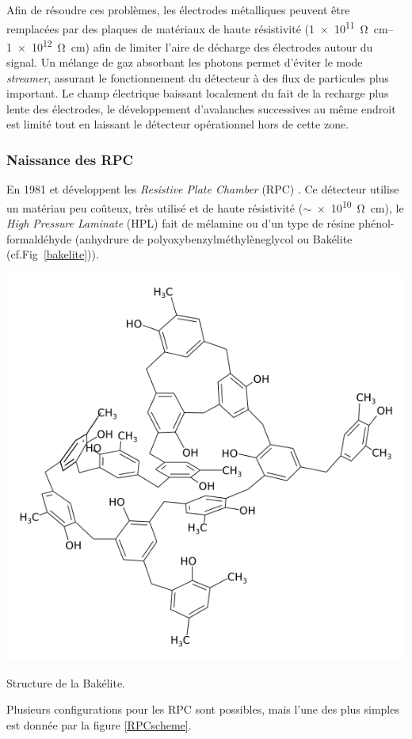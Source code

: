 Afin de résoudre ces problèmes, les électrodes métalliques peuvent être remplacées par des plaques de matériaux de haute résistivité (\SIrange{1e11}{1e12}{\ohm\centi\meter}) afin de limiter l'aire de décharge des électrodes autour du signal. Un mélange de gaz absorbant les photons permet d'éviter le mode \textit{streamer}, assurant le fonctionnement du détecteur à des flux de particules plus important. Le champ électrique baissant localement du fait de la recharge plus lente des électrodes, le développement d'avalanches successives au même endroit est limité tout en laissant le détecteur opérationnel hors de cette zone.
\vspace{-0.4cm}
\subsubsection{Naissance des RPC}
\vspace{-0.4cm}
En \num{1981}  et  développent les \textit{Resistive Plate Chamber} (RPC) \cite{Santonico:1981sc} \cite{CARDARELLI198820}. Ce détecteur utilise un matériau peu coûteux, très utilisé et de haute résistivité ($\sim$\SI{e10}{\ohm\centi\meter}), le \textit{High Pressure Laminate} (HPL) fait de mélamine ou d'un type de résine phénol-formaldéhyde (anhydrure de polyoxybenzylméthylèneglycol ou Bakélite (cf.Fig~\ref{bakelite})). 
\marginpar
{
	\centering
	\includegraphics[width=\marginparwidth]{RPC/bakelite.png}
	\captionsetup{type=figure}\caption{Structure de la Bakélite.}
	\label{bakelite}
}
Plusieurs configurations pour les RPC sont possibles, mais l'une des plus simples est donnée par la figure \ref{RPCscheme}.

